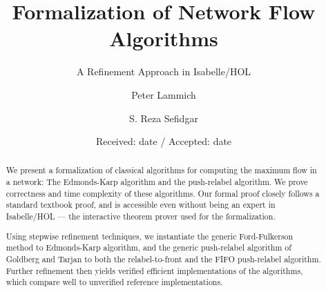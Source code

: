 \documentclass[smallcondensed]{svjour3}     %
\begin{document}
\title{Formalization of Network Flow Algorithms}
\subtitle{A Refinement Approach in Isabelle/HOL}


\author{Peter Lammich \and S. Reza Sefidgar}



\date{Received: date / Accepted: date}


\maketitle

\begin{abstract}
We present a formalization of classical algorithms for computing the maximum flow in a network:
The Edmonds-Karp algorithm and the push-relabel algorithm. 
We prove correctness and time complexity of these algorithms.
Our formal proof closely follows a standard textbook proof, and is accessible even without being
an expert in Isabelle/HOL --- the interactive theorem prover used for the formalization.

Using stepwise refinement techniques, we instantiate the generic Ford-Fulkerson method to Edmonds-Karp algorithm, 
and the generic push-relabel algorithm of Goldberg and Tarjan to both the relabel-to-front and the FIFO push-relabel algorithm.
Further refinement then yields verified efficient implementations of the algorithms, which compare well to unverified reference implementations.

\end{abstract}
\end{document}
